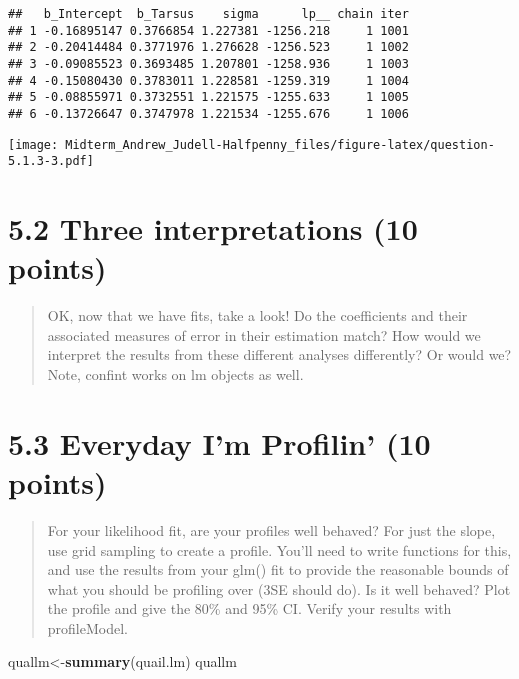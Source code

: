 \documentclass[]{article}
\newenvironment{Shaded}{\begin{snugshade}}{\end{snugshade}}
\newcommand{\KeywordTok}[1]{\textcolor[rgb]{0.13,0.29,0.53}{\textbf{#1}}}
\newcommand{\NormalTok}[1]{#1}
\begin{document}
\begin{verbatim}
##   b_Intercept  b_Tarsus    sigma      lp__ chain iter
## 1 -0.16895147 0.3766854 1.227381 -1256.218     1 1001
## 2 -0.20414484 0.3771976 1.276628 -1256.523     1 1002
## 3 -0.09085523 0.3693485 1.207801 -1258.936     1 1003
## 4 -0.15080430 0.3783011 1.228581 -1259.319     1 1004
## 5 -0.08855971 0.3732551 1.221575 -1255.633     1 1005
## 6 -0.13726647 0.3747978 1.221534 -1255.676     1 1006
\end{verbatim}

\texttt{[image: Midterm\_Andrew\_Judell-Halfpenny\_files/figure-latex/question-5.1.3-3.pdf]}

\section{5.2 Three interpretations (10
points)}\label{three-interpretations-10-points}

\begin{quote}
OK, now that we have fits, take a look! Do the coefficients and their
associated measures of error in their estimation match? How would we
interpret the results from these different analyses differently? Or
would we? Note, confint works on lm objects as well.
\end{quote}

\section{5.3 Everyday I'm Profilin' (10
points)}\label{everyday-im-profilin-10-points}

\begin{quote}
For your likelihood fit, are your profiles well behaved? For just the
slope, use grid sampling to create a profile. You'll need to write
functions for this, and use the results from your glm() fit to provide
the reasonable bounds of what you should be profiling over (3SE should
do). Is it well behaved? Plot the profile and give the 80\% and 95\% CI.
Verify your results with profileModel.
\end{quote}

\begin{Shaded}
\begin{Highlighting}[]
\NormalTok{quallm<-}\KeywordTok{summary}\NormalTok{(quail.lm)}
\NormalTok{quallm}
\end{Highlighting}
\end{Shaded}
\end{document}
